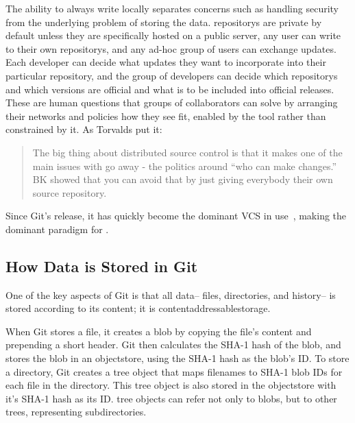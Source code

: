 The ability to always write locally separates concerns such as handling security
from the underlying problem of storing the data. \glspl{repository} are private
by default unless they are specifically hosted on a public server, any user can
write to their own \glspl{repository}, and any ad-hoc group of users can
exchange updates. Each developer can decide what updates they want to
incorporate into their particular \gls{repository}, and the group of developers
can decide which \glspl{repository} and which versions are official and what is
to be included into official releases. These are human questions that groups of
collaborators can solve by arranging their networks and policies how they see
fit, enabled by the tool rather than constrained by it. As Torvalds put it:

\blockcquote{git_10_years_interview}{The big thing about distributed source
    control is that it makes one of the main issues with  go
    away - the politics around \enquote{who can make changes.} BK
     showed that you can avoid that by just giving everybody
their own source \gls{repository}. }

Since Git's release, it has quickly become the dominant \gls{VCS} in
use~\cite{what_are_devs_talking_about}, making  the dominant paradigm for .

%


\subsection{How Data is Stored in Git}
\label{how-data-stored-in-git}

One of the key aspects of Git is that all data-- files, directories, and
history-- is stored according to its content; it is
\gls{contentaddressablestorage}.

When Git stores a file, it creates a \gls{blob} by copying the file's content
and prepending a short header. Git then calculates the SHA-1 hash of the
\gls{blob}, and stores the \gls{blob} in an \gls{objectstore}, using the SHA-1
hash as the \gls{blob}'s ID. To store a directory, Git creates a \gls{tree}
object that maps filenames to SHA-1 \gls{blob} IDs for each file in the
directory. This \gls{tree} object is also stored in the \gls{objectstore} with
it's SHA-1 hash as its ID. \Gls{tree} objects can refer not only to
\glspl{blob}, but to other \glspl{tree}, representing subdirectories.

